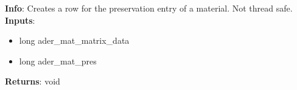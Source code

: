 \textbf{Info}: Creates a row for the preservation entry of a material. Not
thread safe. \\

\noindent \textbf{Inputs}:
\begin{itemize}
\item{long ader\_mat\_matrix\_data}
\item{long ader\_mat\_pres}
\end{itemize}

\noindent \textbf{Returns}: void
